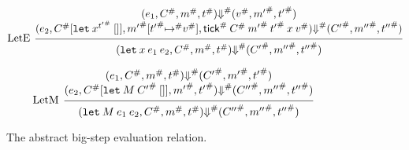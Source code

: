 \documentclass[acmsmall,screen,review]{acmart}
\theoremstyle{definition}
\newcommand*{\A}[1]{{#1}^{\#}}
\newcommand*{\mem}{m}
\newcommand*{\tick}{\mathsf{tick}}
\begin{document}
\begin{figure}[htb]
  \[
    \begin{prooftree}
      \hypo{
        \begin{matrix}
          (e_{1}, \A{C}, \A{\mem}, \A{t})
          \A\Downarrow
          (\A{v}, \A{\mem'}, \A{t'}) \\
          (e_{2}, \A{C}[\mathtt{let}\:x^{\A{t'}}\:[]], \A{\mem'}[\A{t'}\A{\mapsto} \A{v}], \A{\tick}\:\A{C}\:\A{\mem'}\:\A{t'}\:x\:\A{v})
          \A\Downarrow
          (\A{C'}, \A{\mem''}, \A{t''})
        \end{matrix}
      }
      \infer[left label=LetE]1{
      (\mathtt{let}\:x\:e_1\:e_2, \A{C}, \A{\mem}, \A{t})
      \A\Downarrow
      (\A{C'}, \A{\mem''}, \A{t''})
      }
    \end{prooftree}
  \]

  \[
    \begin{prooftree}
      \hypo{
        \begin{matrix}
          (e_{1}, \A{C}, \A{\mem}, \A{t})
          \A\Downarrow
          (\A{C'}, \A{\mem'}, \A{t'}) \\
          (e_{2}, \A{C}[\mathtt{let}\:M\:\A{C'}\:[]], \A{\mem'}, \A{t'})
          \A\Downarrow
          (\A{C''}, \A{\mem''}, \A{t''})
        \end{matrix}
      }
      \infer[left label=LetM]1{
      (\mathtt{let}\:M\:e_{1}\:e_{2}, \A{C}, \A{\mem}, \A{t})
      \A\Downarrow
      (\A{C''}, \A{\mem''}, \A{t''})
      }
    \end{prooftree}
  \]
  \caption{The abstract big-step evaluation relation.}
  \label{fig:abseval}
\end{figure}
\end{document}
